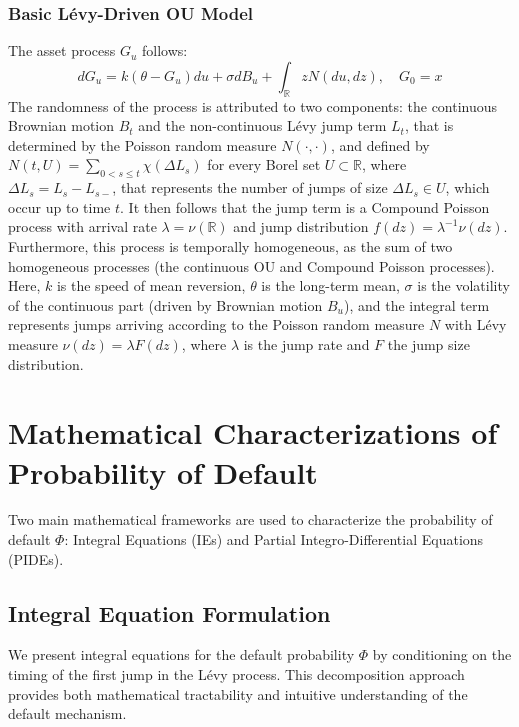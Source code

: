 \documentclass[11pt,twoside,openright]{report}
\begin{document}
\subsubsection{Basic Lévy-Driven OU Model}
The asset process $G_u$ follows:
\begin{equation}
dG_u = k(\theta - G_u)du + \sigma dB_u + \int_{\mathbb{R}} z N(du, dz), \quad G_0 = x
\label{eq:levy_ou_asset}
\end{equation}
The randomness of the process is attributed to two components: the continuous Brownian motion $B_t$ and the non-continuous Lévy jump term $L_t$, that is determined by the Poisson random measure $N(\cdot, \cdot)$, and defined by $N(t, U) = \sum_{0<s \le t} \chi(\Delta L_s)$ for every Borel set $U \subset \mathbb{R}$, where $\Delta L_s = L_s - L_{s-}$, that represents the number of jumps of size $\Delta L_s \in U$, which occur up to time $t$. It then follows that the jump term is a Compound Poisson process with arrival rate $\lambda = \nu(\mathbb{R})$ and jump distribution $f(dz) = \lambda^{-1} \nu(dz)$. Furthermore, this process is temporally homogeneous, as the sum of two homogeneous processes (the continuous OU and Compound Poisson processes).
Here, $k$ is the speed of mean reversion, $\theta$ is the long-term mean, $\sigma$ is the volatility of the continuous part (driven by Brownian motion $B_u$), and the integral term represents jumps arriving according to the Poisson random measure $N$ with Lévy measure $\nu(dz) = \lambda F(dz)$, where $\lambda$ is the jump rate and $F$ the jump size distribution. \cite{kyprianou2006introductory}

\section{Mathematical Characterizations of Probability of Default}

Two main mathematical frameworks are used to characterize the probability of default $\Phi$: Integral Equations (IEs) and Partial Integro-Differential Equations (PIDEs).

\subsection{Integral Equation Formulation}

We present integral equations for the default probability $\Phi$ by conditioning on the timing of the first jump in the Lévy process. This decomposition approach provides both mathematical tractability and intuitive understanding of the default mechanism. \cite{georgiou2023thesis}
\end{document}
